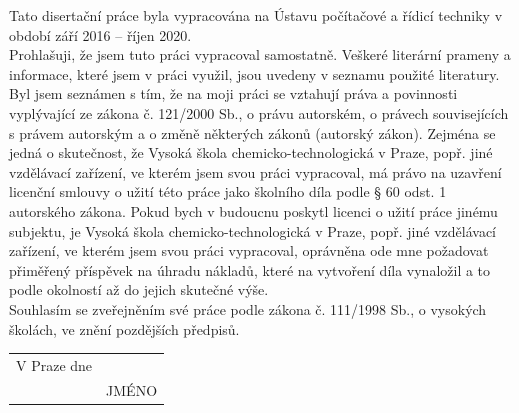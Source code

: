 
\clearpage
\thispagestyle{empty} 
 \vspace*{1cm}
 \noindent 
 Tato disertační práce byla vypracována na Ústavu počítačové a řídicí techniky
v období září 2016 -- říjen 2020. \\ [30mm]
Prohlašuji, že jsem tuto práci vypracoval samostatně. Veškeré literární prameny
a informace, které jsem v práci využil, jsou uvedeny v seznamu použité literatury. \\ [8mm]
Byl jsem seznámen s tím, že na moji práci se vztahují práva a povinnosti vyplývající
ze zákona č. 121/2000 Sb., o právu autorském, o právech souvisejících s právem
autorským a o změně některých zákonů (autorský zákon). Zejména se jedná
o skutečnost, že Vysoká škola chemicko-technologická v Praze, popř. jiné vzdělávací
zařízení, ve kterém jsem svou práci vypracoval, má právo na uzavření licenční
smlouvy o užití této práce jako školního díla podle § 60 odst. 1 autorského zákona.
Pokud bych v budoucnu poskytl licenci o užití práce jinému subjektu, je Vysoká
škola chemicko-technologická v Praze, popř. jiné vzdělávací zařízení, ve kterém
jsem svou práci vypracoval, oprávněna ode mne požadovat přiměřený příspěvek
na úhradu nákladů, které na vytvoření díla vynaložil a to podle okolností až do
jejich skutečné výše. \\ [8mm]
\noindent
Souhlasím se zveřejněním své práce podle zákona č. 111/1998 Sb., o vysokých
školách, ve znění pozdějších předpisů. \\ [30mm]


\noindent\begin{tabular}{@{}p{2.5in}p{}@{}}
\hspace{1cm} V Praze dne                      &\hspace{2cm} \dotfill\\
             & \multicolumn{1}{c}{\hphantom{hhhhHHHHH}JMÉNO}\\
\end{tabular} 

 
\cleardoublepage
\thispagestyle{empty}

